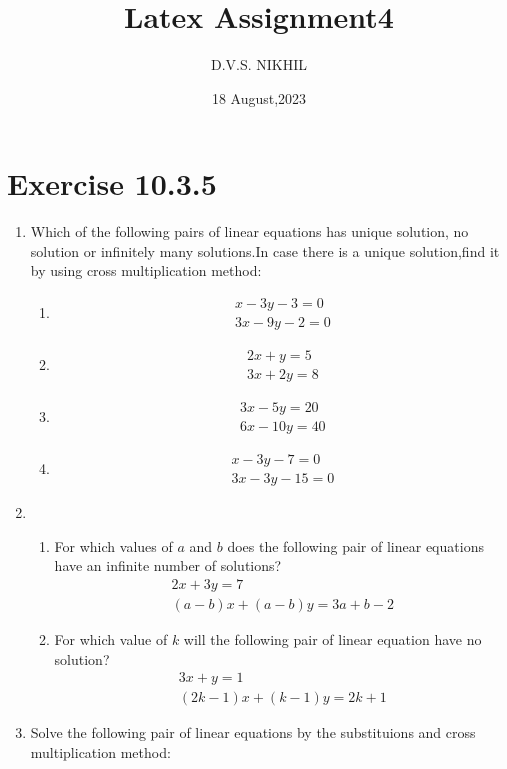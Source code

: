 \documentclass{article}
\theoremstyle{remark}
\begin{document}
\title{Latex Assignment4}
\author{D.V.S. NIKHIL}
\date{18 August,2023}
\maketitle
\section*{Exercise 10.3.5}
\begin{enumerate}
\item Which of the following pairs of linear equations has unique solution, no solution or infinitely many solutions.In case there is a unique solution,find it by using cross multiplication method:
  \begin{enumerate}[label=(\roman*)]
	\item \begin{align}
	x-3y-3=0\\
	3x-9y-2=0
        \end{align}
       \item \begin{align}
	2x+y=5\\
	3x+2y=8
	\end{align}
	\item \begin{align}
	3x-5y=20\\
	6x-10y=40
	\end{align}
	\item \begin{align}
	x-3y-7=0\\
	3x-3y-15=0
        \end{align}
 \end{enumerate}
\item 
  \begin{enumerate}[label=(\roman*)]
  \item For which values of $a$ and $b$ does the following pair of linear equations have an infinite number of solutions?
	\begin{align}
	2x+3y=7\\
	(a-b)x+(a-b)y=3a+b-2
	\end{align}
  \item For which value of $k$ will the following pair of linear equation have no solution?
	\begin{align}
	3x+y=1\\
	(2k-1)x+(k-1)y=2k+1
	\end{align}
   \end{enumerate}
\item Solve the following pair of linear equations by the substituions and cross multiplication method:

\end{enumerate}
\end{document}
